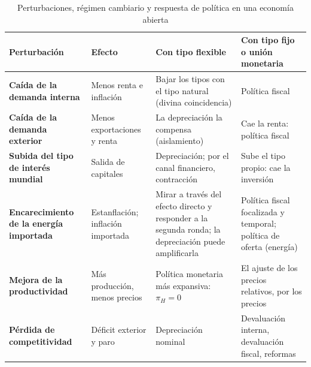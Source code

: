 \documentclass[11pt]{article}
\begin{document}
\begin{table}[H]
\centering
\caption{Perturbaciones, régimen cambiario y respuesta de política en una economía abierta}\label{tab:perturbaciones}
\small
\begin{tabular}{>{\raggedright\arraybackslash}m{3.2cm}>{\raggedright\arraybackslash}m{3.4cm}>{\raggedright\arraybackslash}m{3.7cm}>{\raggedright\arraybackslash}m{3.7cm}}
\toprule
\rowcolor{tceeazulpalido}\textbf{Perturbación} & \textbf{Efecto} & \textbf{Con tipo flexible} & \textbf{Con tipo fijo o unión monetaria}\\
\midrule
\textcolor{tceeazul}{\textbf{Caída de la demanda interna}} & Menos renta e inflación & Bajar los tipos con el tipo natural (divina coincidencia) & Política fiscal\\
\addlinespace[0.3em]
\textcolor{tceeazul}{\textbf{Caída de la demanda exterior}} & Menos exportaciones y renta & La depreciación la compensa (aislamiento) & Cae la renta: política fiscal\\
\addlinespace[0.3em]
\textcolor{tceeazul}{\textbf{Subida del tipo de interés mundial}} & Salida de capitales & Depreciación; por el canal financiero, contracción & Sube el tipo propio: cae la inversión\\
\addlinespace[0.3em]
\textcolor{tceerojo}{\textbf{Encarecimiento de la energía importada}} & Estanflación; inflación importada & Mirar a través del efecto directo y responder a la segunda ronda; la depreciación puede amplificarla & Política fiscal focalizada y temporal; política de oferta (energía)\\
\addlinespace[0.3em]
\textcolor{tceeverde}{\textbf{Mejora de la productividad}} & Más producción, menos precios & Política monetaria más expansiva: $\pi_{H}=0$ & El ajuste de los precios relativos, por los precios\\
\addlinespace[0.3em]
\textcolor{tceerojo}{\textbf{Pérdida de competitividad}} & Déficit exterior y paro & Depreciación nominal & Devaluación interna, devaluación fiscal, reformas\\
\bottomrule
\end{tabular}
\end{table}
\end{document}
